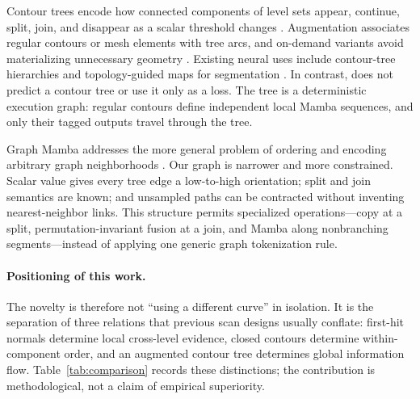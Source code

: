 Contour trees encode how connected components of level sets appear, continue, split, join, and disappear as a scalar threshold changes \cite{carr2003contourtrees}. Augmentation associates regular contours or mesh elements with tree arcs, and on-demand variants avoid materializing unnecessary geometry \cite{sharma2018augmentation,gueunet2019augmented}. Existing neural uses include contour-tree hierarchies and topology-guided maps for segmentation \cite{he2020contourtreegnn,adame2025topovmunet}. In contrast, \method{} does not predict a contour tree or use it only as a loss. The tree is a deterministic execution graph: regular contours define independent local Mamba sequences, and only their tagged outputs travel through the tree.

Graph Mamba addresses the more general problem of ordering and encoding arbitrary graph neighborhoods \cite{behrouz2024graphmamba}. Our graph is narrower and more constrained. Scalar value gives every tree edge a low-to-high orientation; split and join semantics are known; and unsampled paths can be contracted without inventing nearest-neighbor links. This structure permits specialized operations---copy at a split, permutation-invariant fusion at a join, and Mamba along nonbranching segments---instead of applying one generic graph tokenization rule.

\paragraph{Positioning of this work.}
The novelty is therefore not ``using a different curve'' in isolation. It is the separation of three relations that previous scan designs usually conflate: first-hit normals determine local cross-level evidence, closed contours determine within-component order, and an augmented contour tree determines global information flow. Table~\ref{tab:comparison} records these distinctions; the contribution is methodological, not a claim of empirical superiority.
